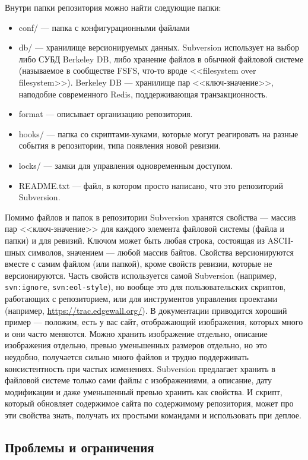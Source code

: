 \documentclass[a5paper]{article}
\begin{document}
Внутри папки репозитория можно найти следующие папки:
\begin{itemize}
	\item conf/ --- папка с конфигурационными файлами
	\item db/ --- хранилище версионируемых данных. Subversion использует на выбор либо СУБД Berkeley DB, либо хранение файлов в обычной файловой системе (называемое в сообществе FSFS, что-то вроде <<filesystem over filesystem>>). Berkeley DB --- хранилище пар <<ключ-значение>>, наподобие современного Redis, поддерживающая транзакционность.
	\item format --- описывает организацию репозитория.
	\item hooks/ --- папка со скриптами-хуками, которые могут реагировать на разные события в репозитории, типа появления новой ревизии.
	\item locks/ --- замки для управления одновременным доступом.
	\item README.txt --- файл, в котором просто написано, что это репозиторий Subversion.
\end{itemize}

Помимо файлов и папок в репозитории Subversion хранятся свойства --- массив пар <<ключ-значение>> для каждого элемента файловой системы (файла и папки) и для ревизий. Ключом может быть любая строка, состоящая из ASCII-шных символов, значением --- любой массив байтов. Свойства версионируются вместе с самим файлом (или папкой), кроме свойств ревизии, которые не версионируются. Часть свойств используется самой Subversion (например, \verb|svn:ignore|, \verb|svn:eol-style|), но вообще это для пользовательских скриптов, работающих с репозиторием, или для инструментов управления проектами (например, \url{https://trac.edgewall.org/}). В документации приводится хороший пример --- положим, есть у вас сайт, отображающий изображения, которых много и они часто меняются. Можно хранить изображение отдельно, описание изображения отдельно, превью уменьшенных размеров отдельно, но это неудобно, получается сильно много файлов и трудно поддерживать консистентность при частых изменениях. Subversion предлагает хранить в файловой системе только сами файлы с изображениями, а описание, дату модификации и даже уменьшенный превью хранить как свойства. И скрипт, который обновляет содержимое сайта по содержимому репозитория, может про эти свойства знать, получать их простыми командами и использовать при деплое.

\subsection{Проблемы и ограничения}
\end{document}
